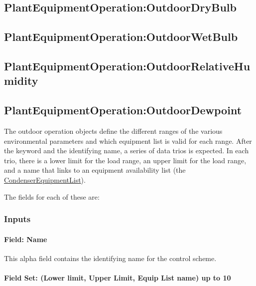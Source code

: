 \subsection{PlantEquipmentOperation:OutdoorDryBulb}\label{plantequipmentoperationoutdoordrybulb}

\subsection{PlantEquipmentOperation:OutdoorWetBulb}\label{plantequipmentoperationoutdoorwetbulb}

\subsection{PlantEquipmentOperation:OutdoorRelativeHumidity}\label{plantequipmentoperationoutdoorrelativehumidity}

\subsection{PlantEquipmentOperation:OutdoorDewpoint}\label{plantequipmentoperationoutdoordewpoint}

The outdoor operation objects define the different ranges of the various environmental parameters and which equipment list is valid for each range. After the keyword and the identifying name, a series of data trios is expected. In each trio, there is a lower limit for the load range, an upper limit for the load range, and a name that links to an equipment availability list (the \hyperref[condenserequipmentlist]{CondenserEquipmentList}).

The fields for each of these are:

\subsubsection{Inputs}\label{inputs-8-015}

\paragraph{Field: Name}\label{field-name-4-019}

This alpha field contains the identifying name for the control scheme.

\paragraph{Field Set: (Lower limit, Upper Limit, Equip List name) up to 10}\label{field-set-lower-limit-upper-limit-equip-list-name-up-to-10-1}

